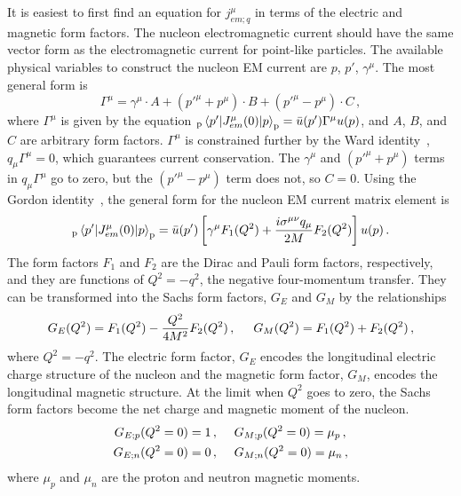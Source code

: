   It is easiest to first find an equation for $j^{\mu}_{em;q}$ in terms of the
  electric and magnetic form factors. The nucleon electromagnetic current
  should have the same vector form as the electromagnetic current for
  point-like particles. The available physical variables to construct the
  nucleon EM current are $p$, $p'$, $\gamma^{\mu}$. The most general form
  is~\cite{Alberico:2001sd}
  \begin{equation}
    \Gamma^{\mu} = \gamma^{\mu}\cdot A + (p'^{\mu} + p^{\mu})\cdot B + (p'^{\mu} - p^{\mu})\cdot C \,,
  \end{equation}
  where $\Gamma^{\mu}$ is given by the equation
  $_{\textrm{p}}\mel{p'}{J^{\mu}_{em}(0)}{p}_{\textrm{p}} =
  \bar{u}(p')\Gamma^{\mu}u(p)$, and $A$, $B$, and $C$ are arbitrary form
  factors.  $\Gamma^{\mu}$ is constrained further by the Ward
  identity~\cite{Ward:1950xp}, $q_{\mu}\Gamma^{\mu} = 0$, which guarantees
  current conservation. The $\gamma^{\mu}$ and $(p'^{\mu} + p^{\mu})$ terms in
  $q_{\mu}\Gamma^{\mu}$ go to zero, but the $(p'^{\mu} - p^{\mu})$ term does
  not, so $C=0$. Using the Gordon identity~\cite{Gordon:1928}, the general form
  for the nucleon EM current matrix element is
  \begin{equation}\label{eq:FFem}
    _{\textrm{p}}\mel{p'}{J^{\mu}_{em}(0)}{p}_{\textrm{p}} =
      \bar{u}(p')\left[ \gamma^{\mu}F_1(Q^2) + \frac{i\sigma^{\mu\nu}q_{\mu}}{2M}F_2(Q^2)  \right]u(p) \,.
  \end{equation}
  The form factors $F_1$ and $F_2$ are the Dirac and Pauli form factors,
  respectively, and they are functions of $Q^2 = -q^2$, the negative
  four-momentum transfer. They can be transformed into the Sachs form factors,
  $G_E$ and $G_M$ by the relationships
  \begin{equation}
    G_E(Q^2) = F_1(Q^2) - \frac{Q^2}{4M^2}F_2(Q^2)\,, \hspace{5mm} G_M(Q^2) = F_1(Q^2) + F_2(Q^2) \,,
  \end{equation}
  where $Q^2 = -q^2$.  The electric form factor, $G_E$ encodes the longitudinal
  electric charge structure of the nucleon and the magnetic form factor, $G_M$,
  encodes the longitudinal magnetic structure. At the limit when $Q^2$ goes to
  zero, the Sachs form factors become the net charge and magnetic moment of the
  nucleon.
  \begin{equation}
    \begin{aligned}
      G_{E;p}(Q^2=0) = 1 \,,& \hspace{5mm} G_{M;p}(Q^2=0) = \mu_p \,, \\
      G_{E;n}(Q^2=0) = 0 \,,& \hspace{5mm} G_{M;n}(Q^2=0) = \mu_n \,,
    \end{aligned}
  \end{equation}
  where $\mu_p$ and $\mu_n$ are the proton and neutron magnetic moments.
 
